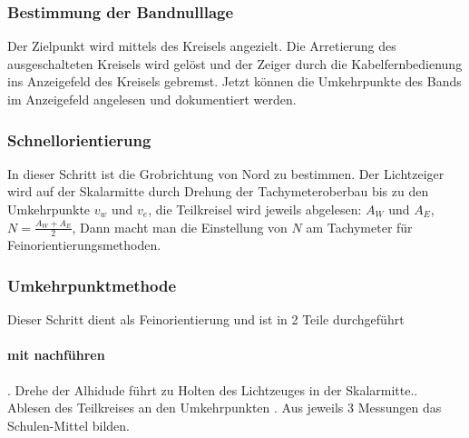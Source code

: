 \documentclass[12pt]{article}
\begin{document}
\subsubsection{Bestimmung der Bandnulllage}
Der Zielpunkt wird mittels des Kreisels angezielt. Die Arretierung des ausgeschalteten Kreisels wird gelöst und der Zeiger durch die Kabelfernbedienung ins Anzeigefeld des Kreisels gebremst. Jetzt können die Umkehrpunkte des Bands im Anzeigefeld angelesen und dokumentiert werden.
\subsubsection{Schnellorientierung}
In dieser Schritt ist die Grobrichtung von Nord zu bestimmen. Der Lichtzeiger wird auf der Skalarmitte durch Drehung der Tachymeteroberbau bis zu den Umkehrpunkte $v_w$ und $v_e$, die Teilkreisel wird jeweils abgelesen: $A_W$ und $A_E$, $N = \frac{A_W + A_E}{2}$, Dann macht man die Einstellung von $N$ am Tachymeter für Feinorientierungsmethoden.
\subsubsection{Umkehrpunktmethode}
Dieser Schritt dient als Feinorientierung und ist in 2 Teile durchgeführt
\paragraph{mit nachführen}
. Drehe der Alhidude führt zu Holten des Lichtzeuges in der Skalarmitte.. Ablesen des Teilkreises an den Umkehrpunkten . Aus jeweils 3 Messungen das Schulen-Mittel bilden. 
\begin{figure}[ht]\centering
\end{figure}
\end{document}
